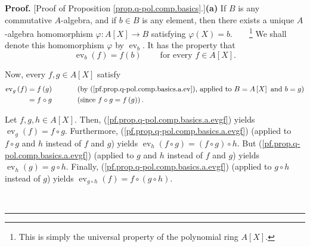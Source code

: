 \documentclass[numbers=enddot,12pt,final,onecolumn,notitlepage]{scrartcl}%
\theoremstyle{definition}
\newenvironment{proof}[1][Proof]{\noindent\textbf{#1.} }{\ \rule{0.5em}{0.5em}}
\begin{document}
\begin{proof}
[Proof of Proposition \ref{prop.q-pol.comp.basics}.]\textbf{(a)} If $B$ is any
commutative $A$-algebra, and if $b\in B$ is any element, then there exists a
unique $A$-algebra homomorphism $\varphi:A\left[  X\right]  \rightarrow B$
satisfying $\varphi\left(  X\right)  =b$.\ \ \ \ \footnote{This is simply the
universal property of the polynomial ring $A\left[  X\right]  $.} We shall
denote this homomorphism $\varphi$ by $\operatorname*{ev}\nolimits_{b}$. It
has the property that%
\begin{equation}
\operatorname*{ev}\nolimits_{b}\left(  f\right)  =f\left(  b\right)
\ \ \ \ \ \ \ \ \ \ \text{for every }f\in A\left[  X\right]  .
\label{pf.prop.q-pol.comp.basics.a.ev}%
\end{equation}


Now, every $f,g\in A\left[  X\right]  $ satisfy%
\begin{align}
\operatorname*{ev}\nolimits_{g}\left(  f\right)   &  =f\left(  g\right)
\ \ \ \ \ \ \ \ \ \ \left(  \text{by (\ref{pf.prop.q-pol.comp.basics.a.ev}),
applied to }B=A\left[  X\right]  \text{ and }b=g\right) \nonumber\\
&  =f\circ g\ \ \ \ \ \ \ \ \ \ \left(  \text{since }f\circ g=f\left(
g\right)  \right)  . \label{pf.prop.q-pol.comp.basics.a.evgf}%
\end{align}


Let $f,g,h\in A\left[  X\right]  $. Then,
(\ref{pf.prop.q-pol.comp.basics.a.evgf}) yields $\operatorname*{ev}%
\nolimits_{g}\left(  f\right)  =f\circ g$. Furthermore,
(\ref{pf.prop.q-pol.comp.basics.a.evgf}) (applied to $f\circ g$ and $h$
instead of $f$ and $g$) yields $\operatorname*{ev}\nolimits_{h}\left(  f\circ
g\right)  =\left(  f\circ g\right)  \circ h$. But
(\ref{pf.prop.q-pol.comp.basics.a.evgf}) (applied to $g$ and $h$ instead of
$f$ and $g$) yields $\operatorname*{ev}\nolimits_{h}\left(  g\right)  =g\circ
h$. Finally, (\ref{pf.prop.q-pol.comp.basics.a.evgf}) (applied to $g\circ h$
instead of $g$) yields $\operatorname*{ev}\nolimits_{g\circ h}\left(
f\right)  =f\circ\left(  g\circ h\right)  $.


\end{proof}
\end{document}
